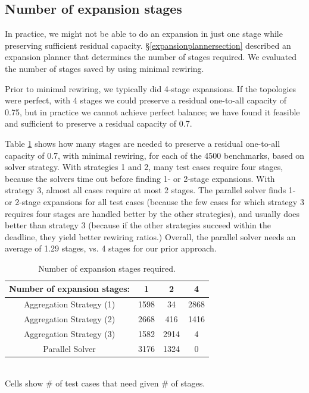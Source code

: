 \documentclass[letterpaper,twocolumn,10pt]{article}
\begin{document}
\subsection{Number of expansion stages}
In practice, we might not be able to do an expansion in just one stage while preserving sufficient residual capacity. \S\ref{expansionplannersection} described an expansion planner that determines the number of stages required. We evaluated the number of stages saved by using minimal rewiring.

Prior to minimal rewiring, we typically did 4-stage expansions.  If the topologies were perfect, with 4 stages we could preserve a residual one-to-all capacity of 0.75, but in practice we cannot achieve perfect balance; we have found it feasible and sufficient to preserve a residual capacity of 0.7.

Table \ref{numstages} shows how many stages are needed to preserve a residual one-to-all capacity of 0.7, with minimal rewiring, for each of the 4500 benchmarks, based on solver strategy.  With strategies 1 and 2, many test cases require four stages, because the solvers time out before finding 1- or 2-stage expansions.  With strategy 3, almost all cases require at most 2 stages. The parallel solver finds 1- or 2-stage expansions for all test cases (because the few cases for which strategy 3 requires four stages are handled better by the other strategies), and usually does better than strategy 3 (because if the other strategies succeed within the deadline, they yield better rewiring ratios.)   Overall, the parallel solver needs an average of 1.29 stages, vs. 4 stages for our prior approach.


\begin{table}[ht]
\small
\centering
\caption{Number of expansion stages required.}\label{numstages}
\begin{tabular}{|c|c|c|c|}
\hline
Number of expansion stages: & 1 & 2 & 4  \\
\hline
\hline
Aggregation Strategy (1) & 1598 & 34 & 2868  \\
\hline
Aggregation Strategy (2) & 2668 & 416 & 1416  \\
\hline
Aggregation Strategy (3) & 1582 & 2914 & 4 \\
\hline
Parallel Solver & 3176 & 1324 & 0 \\
\hline
\end{tabular}
\\Cells show \# of test cases that need given \# of stages.
\end{table}
\end{document}
